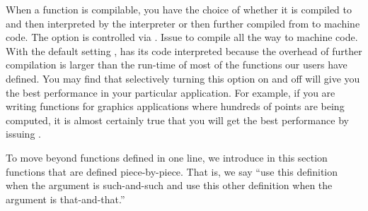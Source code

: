 When a function is compilable, you have the choice of whether it is
compiled to \Lisp{} and then interpreted by the \Lisp{}
interpreter or then further compiled from \Lisp{} to machine code.
The option is controlled via .
Issue  to compile all the way to
machine code.
With
the default setting ,
\Language{} has its \Lisp{} code interpreted
because the overhead of further compilation is larger than the run-time
of most of the functions our users have defined.
You may find that selectively turning this option on and off will
give you the best performance in your particular application.
For example, if you are writing functions for graphics applications
where hundreds of points are being computed, it is almost certainly true
that you will get the best performance by issuing
.


To move beyond functions defined in one line, we introduce in this section
functions that are defined piece-by-piece.
That is, we say ``use this definition when the argument is such-and-such and
use this other definition when the argument is that-and-that.''


